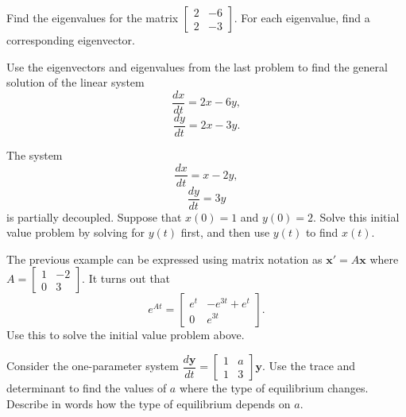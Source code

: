 \documentclass[11pt]{exam}
\begin{document}
\begin{questions}
\question Find the eigenvalues for the matrix $\begin{bmatrix} 2 & -6 \\ 2 & -3 \end{bmatrix}$.  For each eigenvalue, find a corresponding eigenvector. 

\question Use the eigenvectors and eigenvalues from the last problem to find the general solution of the linear system
$$\dfrac{dx}{dt} = 2x - 6y,$$
$$\dfrac{dy}{dt} = 2x - 3y.$$


\question The system 
$$\dfrac{dx}{dt} = x - 2y,$$
$$\dfrac{dy}{dt} = 3y$$
is partially decoupled. Suppose that $x(0) = 1$ and $y(0) = 2$.  Solve this initial value problem by solving for $y(t)$ first, and then use $y(t)$ to find $x(t)$.  

\question The previous example can be expressed using matrix notation as $\mathbf{x}' = A \mathbf{x}$ where $A = \begin{bmatrix} 1 & -2 \\ 0 & 3 \end{bmatrix}$.  It turns out that 
$$e^{At} = \left[\begin{matrix}e^{t} & - e^{3 t} + e^{t}\\0 & e^{3 t}\end{matrix}\right].$$
Use this to solve the initial value problem above. 

\question Consider the one-parameter system $\dfrac{d\mathbf{y}}{dt} = \begin{bmatrix} 1 & a \\ 1 & 3 \end{bmatrix} \mathbf{y}$. Use the trace and determinant to find the values of $a$ where the type of equilibrium changes.  Describe in words how the type of equilibrium depends on $a$. 
\end{questions}
\end{document}
